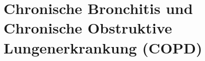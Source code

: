 % 
%   
% 

\bigskip







\section{Chronische Bronchitis und 
Chronische Obstruktive Lungenerkrankung
(COPD)}
\label{topic:copd}
\nocite{Renz-Polster2006} 

